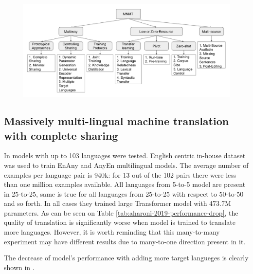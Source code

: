 \begin{figure}[h]
	\begin{minipage}{0.9\textwidth}
	\centering
	\includegraphics[width=1.0\columnwidth]{../img/dabre_2019_mnmt_categorized.png}
	\end{minipage}\hfill
	\label{fig:mnmt_categorized}
\end{figure}


\subsection{Massively multi-lingual machine translation with complete sharing}

In \cite{aharoni-etal-2019-massively} models with up to 103 languages were tested.
English centric in-house dataset was used to train En\to{}Any and Any\to{}En multilingual models.
The average number of examples per language pair is 940k:
for 13 out of the 102 pairs there were less than one million examples available.
All languages from 5-to-5 model are present in 25-to-25, same is true for all languages from 25-to-25 with respect to 50-to-50 and so forth.
In all cases they trained large Transformer model with 473.7M parameters.
As can be seen on Table \ref{tab:aharoni-2019-performance-drop}, the quality of translation
is significantly worse when model is trained to translate more languages.
However, it is worth reminding that this many-to-many experiment may have different results due to many-to-one direction present in it.

The decrease of model's performance with adding more target langueges
is clearly shown in \cite{aharoni-etal-2019-massively}.


